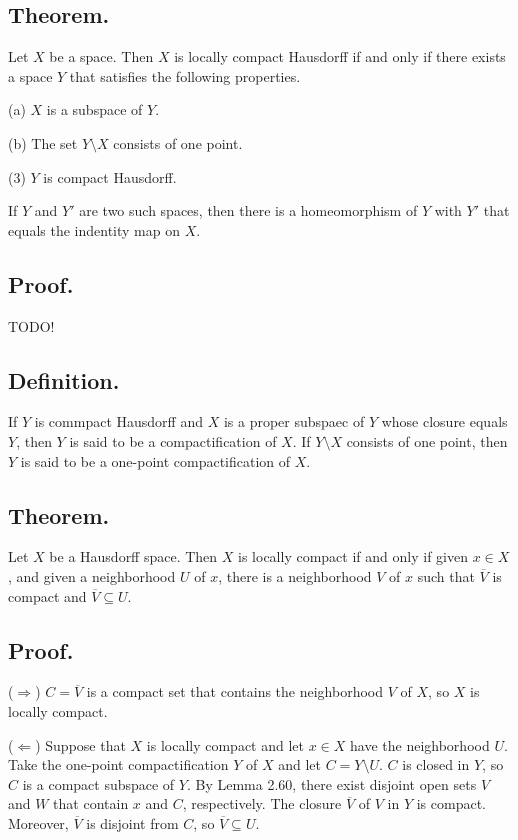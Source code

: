 \documentclass[titlepage]{article}
\begin{document}
\subsection{Theorem.} Let $X$ be a space. Then $X$ is locally compact Hausdorff if and only if there exists a space $Y$ that satisfies the following properties.

(a) $X$ is a subspace of $Y$.

(b) The set $Y \setminus X$ consists of one point.

(3) $Y$ is compact Hausdorff.

If $Y$ and $Y'$ are two such spaces, then there is a homeomorphism of $Y$ with $Y'$ that equals the indentity map on $X$.

\subsection{Proof.} TODO!

\subsection{Definition.} If $Y$ is commpact Hausdorff and $X$ is a proper subspaec of $Y$ whose closure equals $Y$, then $Y$ is said to be a compactification of $X$. If $Y \setminus X$ consists of one point, then $Y$ is said to be a one-point compactification of $X$.

\subsection{Theorem.} Let $X$ be a Hausdorff space. Then $X$ is locally compact if and only if given $x \in X$, and given a neighborhood $U$ of $x$, there is a neighborhood $V$ of $x$ such that $\overline{V}$ is compact and $\overline{V} \subseteq U$.

\subsection{Proof.}

($\Rightarrow$) $C = \overline{V}$ is a compact set that contains the neighborhood $V$ of $X$, so $X$ is locally compact.

($\Leftarrow$) Suppose that $X$ is locally compact and let $x \in X$ have the neighborhood $U$. Take the one-point compactification $Y$ of $X$ and let $C = Y \setminus U$. $C$ is closed in $Y$, so $C$ is a compact subspace of $Y$. By Lemma 2.60, there exist disjoint open sets $V$ and $W$ that contain $x$ and $C$, respectively. The closure $\overline{V}$ of $V$ in $Y$ is compact. Moreover, $\overline{V}$ is disjoint from $C$, so $\overline{V} \subseteq U$.
\end{document}
